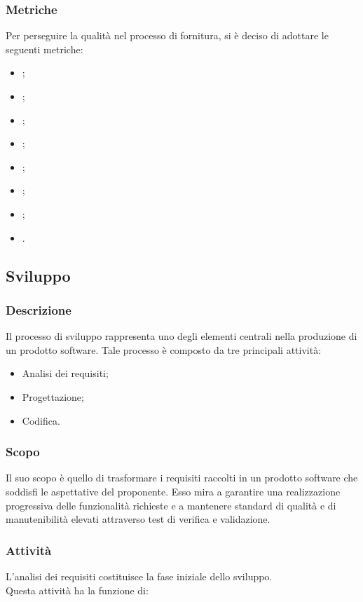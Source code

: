 \subsubsection{Metriche}
Per perseguire la qualità nel processo di fornitura, si è deciso di adottare le
seguenti metriche:
\begin{itemize}
    \item {};
    \item {};
    \item {};
    \item {};
    \item {};
    \item {};
    \item {};
    \item {}.
\end{itemize}

\subsection{Sviluppo}
\subsubsection{Descrizione}
Il processo di sviluppo rappresenta uno degli elementi centrali nella produzione di un
prodotto software. 
Tale processo è composto da tre principali attività:
\begin{itemize}
    \item Analisi dei requisiti;
    \item Progettazione;
    \item Codifica.
\end{itemize}

\subsubsection{Scopo}
Il suo scopo è quello di trasformare i requisiti raccolti in un
prodotto software che soddisfi le aspettative del proponente. Esso mira a garantire
una realizzazione progressiva delle funzionalità richieste e a mantenere 
standard di qualità e di manutenibilità elevati attraverso test di verifica e
validazione.

\subsubsection{Attività}
L'analisi dei requisiti costituisce la fase iniziale dello sviluppo.\\
Questa attività ha la funzione di:

